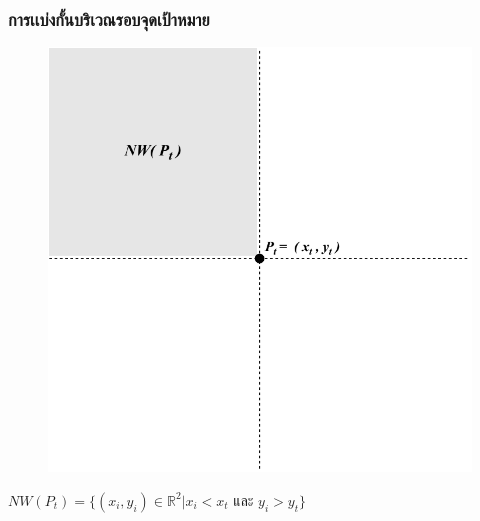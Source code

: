 \documentclass[12pt,aspectratio=169]{beamer}
\begin{document}
\begin{frame}
\frametitle{การเเบ่งกั้นบริเวณรอบจุดเป้าหมาย}
\begin{center}
                \begin{figure}
                    \includegraphics[scale=0.5]{img/NWP_t.pdf}
                \end{figure}
               $NW(P_t) = \{(x_{i} , y_{i}) \in \mathbb{R}^2 | x_{i} < x_{t} \text{ และ } y_{i} > y_{t}\}$
            \end{center}
\end{frame}
\end{document}
